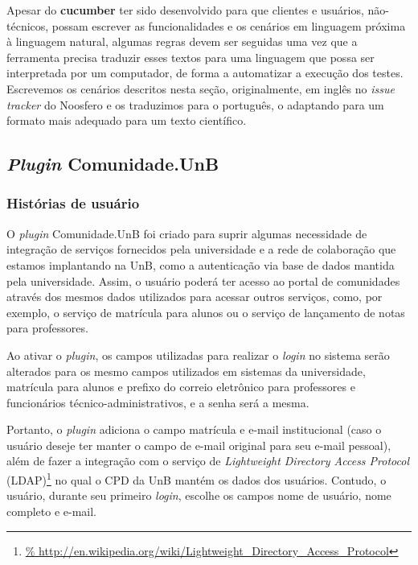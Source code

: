 Apesar do \textbf{cucumber} ter sido desenvolvido para que clientes e usuários,
não-técnicos, possam escrever as funcionalidades e os cenários em linguagem
próxima à linguagem natural, algumas regras devem ser seguidas uma vez que
a ferramenta precisa traduzir esses textos para uma linguagem que possa ser
interpretada por um computador, de forma a automatizar a execução dos testes.
%
Escrevemos os cenários descritos nesta seção, originalmente, em inglês no
\textit{issue tracker} do Noosfero e os traduzimos para o português,
o adaptando para um formato mais adequado para um texto científico.


\subsection{\textit{Plugin} Comunidade.UnB}

\subsubsection*{Histórias de usuário}

O \textit{plugin} Comunidade.UnB foi criado para suprir algumas necessidade de
integração de serviços fornecidos pela universidade e a rede de colaboração que
estamos implantando na UnB, como a autenticação via base de dados mantida pela universidade.
%
Assim, o usuário poderá ter acesso ao portal de comunidades através dos mesmos
dados utilizados para acessar outros serviços, como, por exemplo, o serviço de
matrícula para alunos ou o serviço de lançamento de notas para professores.

Ao ativar o \textit{plugin}, os campos utilizadas para realizar o \textit{login}
no sistema serão alterados para os mesmo campos utilizados em sistemas da
universidade, matrícula para alunos e prefixo do correio eletrônico para
professores e funcionários técnico-administrativos, e a senha será a mesma.

Portanto, o \textit{plugin} adiciona o campo matrícula e e-mail institucional
(caso o usuário deseje ter manter o campo de e-mail original para seu e-mail
pessoal), além de fazer a integração com o serviço de \textit{Lightweight
Directory Access Protocol} (LDAP)\footnote{\url{%
http://en.wikipedia.org/wiki/Lightweight_Directory_Access_Protocol}}
no qual o CPD da UnB mantém os dados dos usuários. Contudo, o usuário, durante
seu primeiro \textit{login}, escolhe os campos nome de usuário, nome completo
e e-mail.

